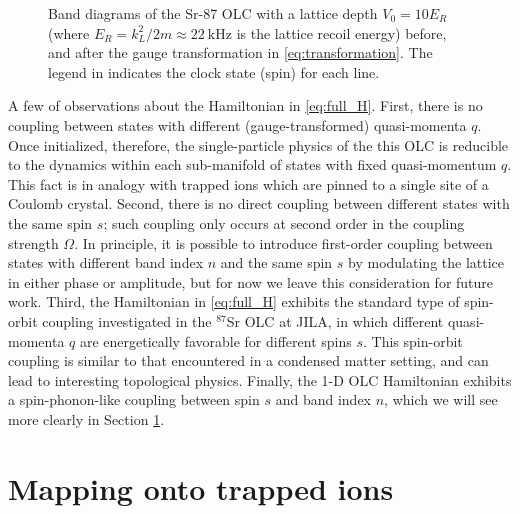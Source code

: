\documentclass[aps,notitlepage,nofootinbib,11pt]{revtex4-1}
\newcommand{\sref}[1]{\protect\subref{#1}}
\renewcommand{\t}{\text} %
\newcommand{\1}{\mathds{1}}
\begin{document}
\begin{figure}
   
  \caption{Band diagrams of the Sr-87 OLC with a lattice depth
    $V_0=10E_R$ (where $E_R=k_L^2/2m\approx22~\t{kHz}$ is the lattice
    recoil energy) \sref{fig:before} before, and \sref{fig:after}
    after the gauge transformation in \eqref{eq:transformation}. The
    legend in \sref{fig:after} indicates the clock state (spin) for
    each line.}
  \label{fig:bands}
\end{figure}

A few of observations about the Hamiltonian in \eqref{eq:full_H}.
First, there is no coupling between states with different
(gauge-transformed) quasi-momenta $q$.  Once initialized, therefore,
the single-particle physics of the this OLC is reducible to the
dynamics within each sub-manifold of states with fixed quasi-momentum
$q$.  This fact is in analogy with trapped ions which are pinned to a
single site of a Coulomb crystal.  Second, there is no direct coupling
between different states with the same spin $s$; such coupling only
occurs at second order in the coupling strength $\Omega$.  In
principle, it is possible to introduce first-order coupling between
states with different band index $n$ and the same spin $s$ by
modulating the lattice in either phase or amplitude, but for now we
leave this consideration for future work.  Third, the Hamiltonian in
\eqref{eq:full_H} exhibits the standard type of spin-orbit coupling
investigated in the $^{87}$Sr OLC at JILA, in which different
quasi-momenta $q$ are energetically favorable for different spins $s$.
This spin-orbit coupling is similar to that encountered in a condensed
matter setting, and can lead to interesting topological physics.
Finally, the 1-D OLC Hamiltonian exhibits a spin-phonon-like coupling
between spin $s$ and band index $n$, which we will see more clearly in
Section \ref{sec:ions}.


\section{Mapping onto trapped ions}
\label{sec:ions}
\end{document}
